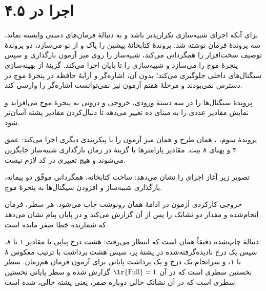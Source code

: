 \documentclass[12pt,a4paper]{article}
\begin{document}
	\section*{۴.۵ اجرا در }
	برای آنکه اجرای شبیه‌سازی تکرارپذیر باشد و به دنبالهٔ فرمان‌های دستی وابسته نماند، سه پروندهٔ فرمان نوشته شد. پروندهٔ  کتابخانهٔ پیشین را پاک و از نو می‌سازد، دو پروندهٔ توصیف سخت‌افزار را همگردانی می‌کند، شبیه‌ساز را روی میز آزمون بارگذاری و سپس پنجرهٔ موج را می‌سازد و شبیه‌سازی را تا پایان اجرا می‌کند. گزینهٔ  از بهینه‌سازی سیگنال‌های داخلی جلوگیری می‌کند؛ بدون آن، اشاره‌گر و آرایهٔ حافظه در پنجرهٔ موج در دسترس نمی‌بودند و مرحلهٔ هفتم آزمون نیز نمی‌توانست اشاره‌گر را وارسی کند.


	پروندهٔ  سیگنال‌ها را در سه دستهٔ ورودی، خروجی و درونی به پنجرهٔ موج می‌افزاید و نمایش مقادیر عددی را به مبنای ده تغییر می‌دهد تا دنبال‌کردن مقادیر پشته آسان‌تر شود.


	پروندهٔ سوم، ، همان طرح و همان میز آزمون را با پیکربندی دیگری اجرا می‌کند: عمق ۴ و پهنای ۸ بیت. مقادیر پارامترها با گزینهٔ  در زمان بارگذاری شبیه‌ساز جایگزین می‌شوند و هیچ تغییری در کد لازم نیست.


	تصویر زیر آغاز اجرای  را نشان می‌دهد: ساخت کتابخانه، همگردانی موفّق دو پیمانه، بارگذاری شبیه‌ساز و افزودن سیگنال‌ها به پنجرهٔ موج.


	خروجی کارکردی آزمون در ادامهٔ همان رونوشت چاپ می‌شود. هر سطر، فرمان انجام‌شده و مقدار دو نشانک را پس از آن گزارش می‌کند و در پایان پیام  نشان می‌دهد که شمارندهٔ خطا صفر مانده است.


	دنبالهٔ چاپ‌شده دقیقاً همان است که انتظار می‌رفت: هشت درج پیاپی با مقادیر ۱ تا ۸، سپس یک درج نادیده‌گرفته‌شده در پشتهٔ پر، سپس هشت برداشت با ترتیب معکوس ۸ تا ۱، و سرانجام یک درج و یک برداشت پایانی برای آزمون فرمان هم‌زمان. سطر  نخستین سطری است که در آن \(\text{\lr{Full}}=1\) گزارش شده و سطر پایانی  نخستین سطری است که در آن نشانک خالی دوباره صفر، یعنی پشته خالی، شده است.
\end{document}
